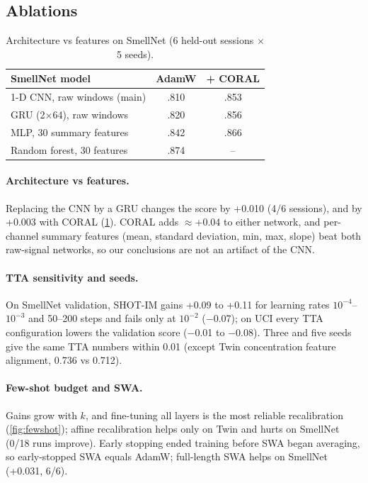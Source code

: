 \documentclass[10pt,twocolumn,letterpaper]{article}
\begin{document}
\subsection{Ablations}
\label{sec:ablations}
\begin{table}[t]
\centering\footnotesize\setlength{\tabcolsep}{4pt}
\begin{tabular}{@{}lcc@{}}
\toprule
SmellNet model & AdamW & + CORAL \\
\midrule
1-D CNN, raw windows (main) & .810 & .853 \\
GRU (2$\times$64), raw windows & .820 & .856 \\
MLP, 30 summary features & .842 & .866 \\
Random forest, 30 features & .874 & -- \\
\bottomrule
\end{tabular}
\caption{Architecture vs features on SmellNet (6 held-out sessions $\times$ 5 seeds).}
\label{tab:arch}
\end{table}
\paragraph{Architecture vs features.} Replacing the CNN by a GRU changes the score by +0.010 (4/6 sessions), and by
+0.003 with CORAL (\cref{tab:arch}). CORAL adds $\approx$+0.04 to either network, and per-channel summary features
(mean, standard deviation, min, max, slope) beat both raw-signal networks, so our conclusions are not an artifact of
the CNN.

\paragraph{TTA sensitivity and seeds.} On SmellNet validation, SHOT-IM gains +0.09 to +0.11 for learning rates
$10^{-4}$--$10^{-3}$ and 50--200 steps and fails only at $10^{-2}$ ($-$0.07); on UCI every TTA configuration lowers
the validation score ($-$0.01 to $-$0.08). Three and five seeds give the same TTA numbers within 0.01 (except Twin
concentration feature alignment, 0.736 vs 0.712).

\paragraph{Few-shot budget and SWA.} Gains grow with $k$, and fine-tuning all layers is the most reliable
recalibration (\cref{fig:fewshot}); affine recalibration helps only on Twin and hurts on SmellNet (0/18 runs
improve). Early stopping ended training before SWA began averaging, so early-stopped SWA equals AdamW; full-length
SWA helps on SmellNet (+0.031, 6/6).
\end{document}
